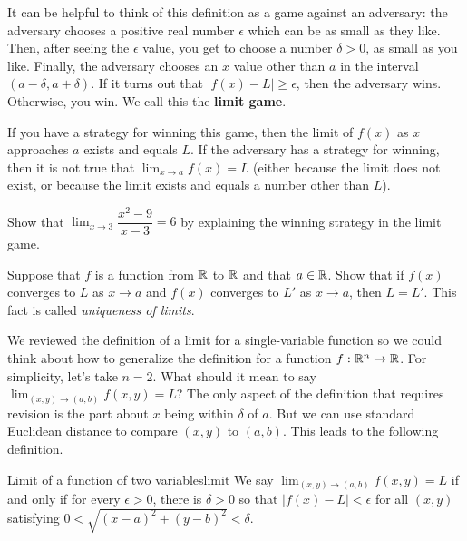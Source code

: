 \documentclass{watsonbook}
\begin{document}
It can be helpful to think of this definition as a game against an
adversary: the adversary chooses a positive real number $\epsilon$
which can be as small as they like. Then, after seeing the $\epsilon$
value, you get to choose a number $\delta>0$, as small as you
like. Finally, the adversary chooses an $x$ value other than $a$ in
the interval $(a-\delta, a + \delta)$. If it turns out that $|f(x) -
L| \geq \epsilon$, then the adversary wins. Otherwise, you win. We
call this the \textbf{limit game}. 

If you have a strategy for winning this game, then the limit of $f(x)$
as $x$ approaches $a$ exists and equals $L$. If the adversary has a
strategy for winning, then it is not true that $\lim_{x \to a} f(x) =
L$ (either because the limit does not exist, or because the limit
exists and equals a number other than $L$).

\begin{exercise}{}{}
  Show that $\displaystyle{\lim_{x \to 3}}\dfrac{x^2 - 9}{x - 3} = 6$ by explaining
  the winning strategy in the limit game. 
\end{exercise}

\begin{exercise}{}{}
  Suppose that $f$ is a function from $\mathbb{R}$ to $\mathbb{R}$ and that
  $a \in \mathbb{R}$. Show that if $f(x)$ converges to $L$ as $x\to a$ and
  $f(x)$ converges to $L'$ as $x\to a$, then $L = L'$. This fact is called
  \textit{uniqueness of limits}. 
\end{exercise}

We reviewed the definition of a limit for a single-variable function
so we could think about how to generalize the definition for a
function $f:\mathbb{R}^n \to \mathbb{R}$. For simplicity, let's take $n = 2$. What
should it mean to say
$\displaystyle{\lim_{(x,y) \to (a,b)} f(x,y)} = L$? The only aspect of 
the definition that requires revision is the part about $x$ being
within $\delta$ of $a$. But we can use standard Euclidean distance to
compare $(x,y)$ to $(a,b)$. This leads to the following definition. 

\begin{defn}{Limit of a function of two variables}{limit}
  We say $\lim_{(x,y)\to (a,b)} f(x,y) = L$ if and only if for every
  $\epsilon > 0$, there is $\delta>0$ so that $|f(x) - L| < \epsilon$
  for all $(x,y)$ satisfying $0 < \sqrt{(x -a)^2 + (y-b)^2} < \delta$. 
\end{defn}
\end{document}
